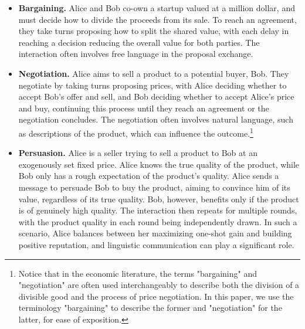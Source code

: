\begin{itemize}
\item \textbf{Bargaining.} Alice and Bob co-own a startup valued at a million dollar, and must decide how to divide the proceeds from its sale. To reach an agreement, they take turns proposing how to split the shared value, with each delay in reaching a decision reducing the overall value for both parties. The interaction often involves free language in the proposal exchange.
\item \textbf{Negotiation.} Alice aims to sell a product to a potential buyer, Bob. They negotiate by taking turns proposing prices, with Alice deciding whether to accept Bob's offer and sell, and Bob deciding whether to accept Alice's price and buy, continuing this process until they reach an agreement or the negotiation concludes. The negotiation often involves natural language, such as descriptions of the product, which can influence the outcome.\footnote{Notice that in the economic literature, the terms "bargaining" and "negotiation" are often used interchangeably to describe both the division of a divisible good and the process of price negotiation. In this paper, we use the terminology "bargaining" to describe the former and "negotiation" for the latter, for ease of exposition.}
\item \textbf{Persuasion.} Alice is a seller trying to sell a product to Bob at an exogenously set fixed price. Alice knows the true quality of the product, while Bob only has a rough expectation of the product's quality. Alice sends a message to persuade Bob to buy the product, aiming to convince him of its value, regardless of its true quality. Bob, however, benefits only if the product is of genuinely high quality. The interaction then repeats for multiple rounds, with the product quality in each round being independently drawn. In such a scenario, Alice balances between her maximizing one-shot gain and building positive reputation, and linguistic communication can play a significant role.
\end{itemize}


